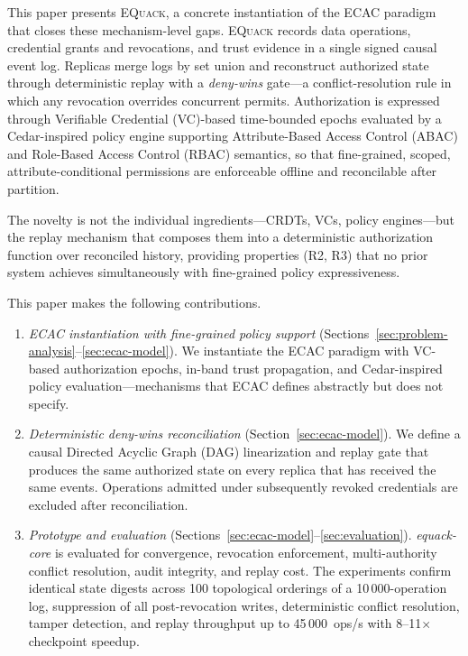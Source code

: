 \documentclass[10pt,journal,compsoc]{IEEEtran}
\newcommand{\equack}{\textsc{EQuack}}
\begin{document}
  This paper presents \equack{}, a concrete instantiation of the
  ECAC paradigm that closes these mechanism-level gaps. \equack{}
  records data operations, credential grants and revocations, and
  trust evidence in a single signed causal event log. Replicas
  merge logs by set union and reconstruct authorized state through
  deterministic replay with a \emph{deny-wins} gate---a conflict-resolution rule in which any revocation overrides concurrent permits. Authorization is
  expressed through Verifiable Credential (VC)-based time-bounded epochs evaluated by a
  Cedar-inspired policy engine supporting Attribute-Based Access Control (ABAC) and Role-Based Access Control (RBAC) semantics,
  so that fine-grained, scoped, attribute-conditional permissions
  are enforceable offline and reconcilable after partition.

  The novelty is not the individual ingredients---CRDTs, VCs,
  policy engines---but the replay mechanism that composes them into
  a deterministic authorization function over reconciled history,
  providing properties (R2, R3) that no prior system achieves
  simultaneously with fine-grained policy expressiveness.

  This paper makes the following contributions.
\begin{enumerate}
    \item \textit{ECAC instantiation with fine-grained policy
      support} (Sections~\ref{sec:problem-analysis}--\ref{sec:ecac-model}).
      We instantiate the ECAC paradigm
      with VC-based authorization epochs, in-band trust propagation,
      and Cedar-inspired policy evaluation---mechanisms that ECAC
      defines abstractly but does not specify.

    \item \textit{Deterministic deny-wins reconciliation}
      (Section~\ref{sec:ecac-model}).  We define a causal Directed Acyclic Graph (DAG)
      linearization and replay gate that produces the same authorized
      state on every replica that has received the same events.
      Operations admitted under subsequently revoked credentials are
      excluded after reconciliation.

    \item \textit{Prototype and evaluation}
      (Sections~\ref{sec:ecac-model}--\ref{sec:evaluation}).  \textit{equack-core} is evaluated for convergence, revocation
      enforcement, multi-authority conflict resolution, audit integrity,
      and replay cost.  The experiments confirm identical state digests
      across 100 topological orderings of a 10\,000-operation log,
      suppression of all post-revocation writes, deterministic conflict
      resolution, tamper detection, and replay throughput up to
      45\,000~ops/s with 8--11$\times$ checkpoint speedup.
\end{enumerate}
\end{document}
